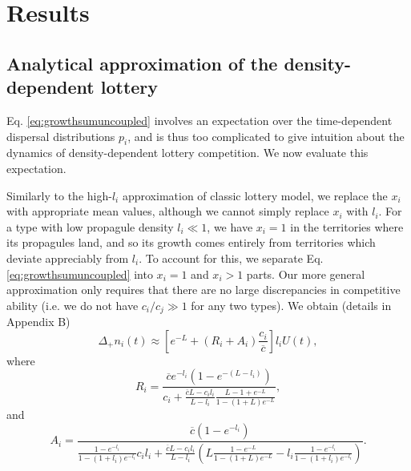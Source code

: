 \documentclass[11pt]{article}
\begin{document}
\section*{Results}

\subsection*{Analytical approximation of the density-dependent lottery}

Eq. \eqref{eq:growthsumuncoupled} involves an expectation over the time-dependent dispersal distributions $p_i$, and is thus too complicated to give intuition about the dynamics of density-dependent lottery competition. We now evaluate this expectation. 

Similarly to the high-$l_i$ approximation of classic lottery model, we replace the $x_i$ with appropriate mean values, although we cannot simply replace $x_i$ with $l_i$. For a type with low propagule density $l_i\ll 1$, we have $x_i=1$ in the territories where its propagules land, and so its growth comes entirely from territories which deviate appreciably from $l_i$. To account for this, we separate Eq. \eqref{eq:growthsumuncoupled} into $x_i=1$ and $x_i>1$ parts. Our more general approximation only requires that there are no large discrepancies in competitive ability (i.e. we do not have $c_i/c_j\gg 1$ for any two types). We obtain (details in Appendix B)
\begin{equation}
\Delta_+ n_i(t)\approx \left[e^{-L}+(R_i+A_i)\frac{c_i}{\overline{c}}\right]l_i U(t), \label{eq:master}
\end{equation}
where
\begin{equation}
R_i=\frac{\overline{c}e^{-l_i}(1-e^{-(L-l_i)})}{c_i +\frac{\overline{c}L- c_il_i}{L-l_i}\frac{L-1+e^{-L}}{1-(1+L)e^{-L}}},\nonumber \label{eq:Dr}
\end{equation}
and
\begin{equation}
A_i=\frac{\overline{c}(1-e^{-l_i})}{\frac{1-e^{-l_i}}{1-(1+l_i)e^{-l_i}}c_il_i+\frac{\overline{c}L- c_il_i}{L-l_i}\left(L\frac{1-e^{-L}}{1-(1+L)e^{-L}}-l_i\frac{1-e^{-l_i}}{1-(1+l_i)e^{-l_i}}\right)}. \nonumber \label{eq:Da}
\end{equation}
\end{document}
